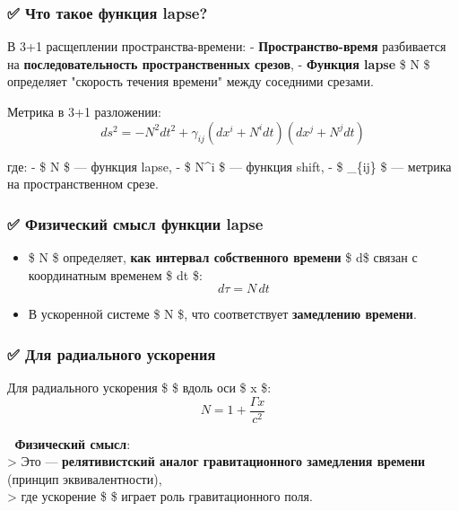 \documentclass[11pt]{article}
\providecommand{\tightlist}{%
      \setlength{\itemsep}{0pt}\setlength{\parskip}{0pt}}
\begin{document}
\subsubsection{✅ Что такое функция
lapse?}\label{ux447ux442ux43e-ux442ux430ux43aux43eux435-ux444ux443ux43dux43aux446ux438ux44f-lapse}

В 3+1 расщеплении пространства-времени: - \textbf{Пространство-время}
разбивается на \textbf{последовательность пространственных срезов}, -
\textbf{Функция lapse} \$ N \$ определяет "скорость течения времени"
между соседними срезами.

Метрика в 3+1 разложении: \[
\boxed{
ds^2 = -N^2 dt^2 + \gamma_{ij} (dx^i + N^i dt)(dx^j + N^j dt)
}
\]

где: - \$ N \$ --- функция lapse, - \$ N\^{}i \$ --- функция shift, - \$
\gamma\_\{ij\} \$ --- метрика на пространственном срезе.

\subsubsection{✅ Физический смысл функции
lapse}\label{ux444ux438ux437ux438ux447ux435ux441ux43aux438ux439-ux441ux43cux44bux441ux43b-ux444ux443ux43dux43aux446ux438ux438-lapse}

\begin{itemize}
\tightlist
\item
  \$ N \$ определяет, \textbf{как интервал собственного времени} \$
  d\tau \$ связан с координатным временем \$ dt \$: \[
    d\tau = N \, dt
    \]
\item
  В ускоренной системе \$ N  \$, что соответствует
  \textbf{замедлению времени}.
\end{itemize}

\subsubsection{✅ Для радиального
ускорения}\label{ux434ux43bux44f-ux440ux430ux434ux438ux430ux43bux44cux43dux43eux433ux43e-ux443ux441ux43aux43eux440ux435ux43dux438ux44f}

Для радиального ускорения \$ \Gamma \$ вдоль оси \$ x \$: \[
\boxed{
N = 1 + \frac{\Gamma x}{c^2}
}
\]

📌 \textbf{Физический смысл}:\\
\textgreater{} Это --- \textbf{релятивистский аналог гравитационного
замедления времени} (принцип эквивалентности),\\
\textgreater{} где ускорение \$ \Gamma \$ играет роль гравитационного
поля.
\end{document}
